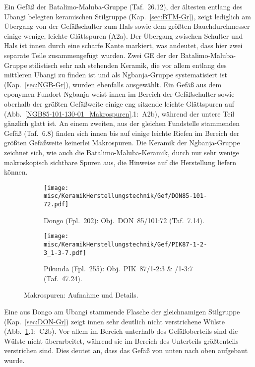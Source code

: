 Ein Gefäß der Batalimo-Maluba-Gruppe (Taf.~26.12), der ältesten entlang des Ubangi belegten keramischen Stilgruppe (Kap.~\ref{sec:BTM-Gr}), zeigt lediglich am Übergang von der Gefäßschulter zum Hals sowie dem größten Bauchdurchmesser einige wenige, leichte Glättspuren (A2a). Der Übergang zwischen Schulter und Hals ist innen durch eine scharfe Kante markiert, was andeutet, dass hier zwei separate Teile zusammengefügt wurden. Zwei GE der der Batalimo-Maluba-Gruppe stilistisch sehr nah stehenden Keramik, die vor allem entlang des mittleren Ubangi zu finden ist und als Ngbanja-Gruppe systematisiert ist (Kap.~\ref{sec:NGB-Gr}), wurden ebenfalls ausgewählt. Ein Gefäß aus dem eponymen Fundort Ngbanja weist innen im Bereich der Gefäßschulter sowie oberhalb der größten Gefäßweite einige eng sitzende leichte Glättspuren auf (Abb.~\ref{NGB85-101-130-01_Makrospuren}.1:~A2b), während der untere Teil gänzlich glatt ist. An einem zweiten, aus der gleichen Fundstelle stammenden Gefäß (Taf.~6.8) finden sich innen bis auf einige leichte Riefen im Bereich der größten Gefäßweite keinerlei Makrospuren. Die Keramik der Ngbanja-Gruppe zeichnet sich, wie auch die Batalimo-Maluba-Keramik, durch nur sehr wenige makroskopisch sichtbare Spuren aus, die Hinweise auf die Herstellung liefern können.

\begin{figure*}[p]
	\centering
	\begin{subfigure}{\textwidth}
		\centering
		\texttt{[image: misc/KeramikHerstellungstechnik/Gef/DON85-101-72.pdf]}
		\caption{Dongo (Fpl.~202): Obj.~DON~85/101:72 (Taf.~7.14).\vspace{1em}}
		\label{DON85-101-71_Makrospuren}
	\end{subfigure}
	\begin{subfigure}{\textwidth}
		\centering
		\texttt{[image: misc/KeramikHerstellungstechnik/Gef/PIK87-1-2-3\_1-3-7.pdf]}
		\caption{Pikunda (Fpl.~255): Obj.~PIK~87/1-2:3 \& /1-3:7 (Taf.~47.24).}
		\label{PIK87-1-2-3_1-3-7_Makrospuren}
	\end{subfigure}
	\caption{Makrospuren: Aufnahme und Details.}
\end{figure*}

Eine aus Dongo am Ubangi stammende Flasche der gleichnamigen Stilgruppe (Kap.~\ref{sec:DON-Gr}) zeigt innen sehr deutlich nicht verstrichene Wülste (Abb.~\ref{DON85-101-71_Makrospuren}.1:~C2b). Vor allem im Bereich unterhalb des Gefäßoberteils sind die Wülste nicht überarbeitet, während sie im Bereich des Unterteils größtenteils verstrichen sind. Dies deutet an, dass das Gefäß von unten nach oben aufgebaut wurde.

